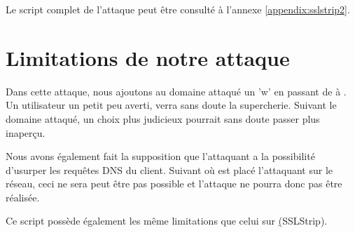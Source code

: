 Le script complet de l'attaque peut être consulté à l'annexe \ref{appendix:sslstrip2}.

\section{Limitations de notre attaque}

Dans cette attaque, nous ajoutons au domaine attaqué un 'w' en passant de  à . Un utilisateur un petit peu averti, verra sans doute la supercherie. Suivant le domaine attaqué, un choix plus judicieux pourrait sans doute passer plus inaperçu.

Nous avons également fait la supposition que l'attaquant a la possibilité d'usurper les requêtes DNS du client. Suivant où est placé l'attaquant sur le réseau, ceci ne sera peut être pas possible et l'attaque ne pourra donc pas être réalisée.

Ce script possède également les même limitations que celui sur \hyperref[sec:sslstrip](SSLStrip).
